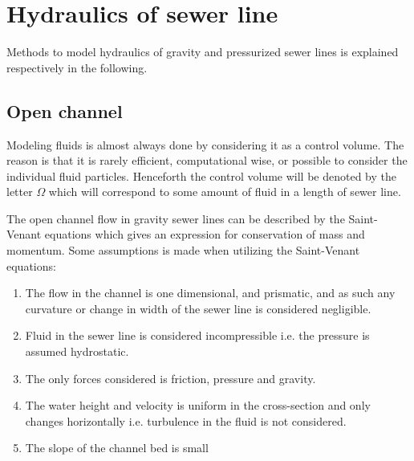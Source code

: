 \section{Hydraulics of sewer line}\label{se:hydraulics_of_sewer_line}
Methods to model hydraulics of gravity and pressurized sewer lines is explained respectively in the following. 


\subsection{Open channel}\label{subse:open_channel}
Modeling fluids is almost always done by considering it as a control volume. The reason is that it is rarely efficient, computational wise, or possible to consider the individual fluid particles.
Henceforth the control volume will be denoted by the letter $\Omega$ which will correspond to some amount of fluid in a length of sewer line.

The open channel flow in gravity sewer lines can be described by the Saint-Venant equations which gives an expression for conservation of mass and momentum.
Some assumptions is made when utilizing the Saint-Venant equations:

\begin{table}[H]
\begin{enumerate}
\item The flow in the channel is one dimensional, and prismatic, and as such any curvature or change in width of the sewer line is considered negligible.
\item Fluid in the sewer line is considered incompressible i.e. the pressure is assumed hydrostatic.
\item The only forces considered is friction, pressure and gravity.
\item The water height and velocity is uniform in the cross-section and only changes horizontally i.e. turbulence in the fluid is not considered.
\item The slope of the channel bed is small
\end{enumerate}
\label{tab:saintbernard_assumptions}
\end{table}

